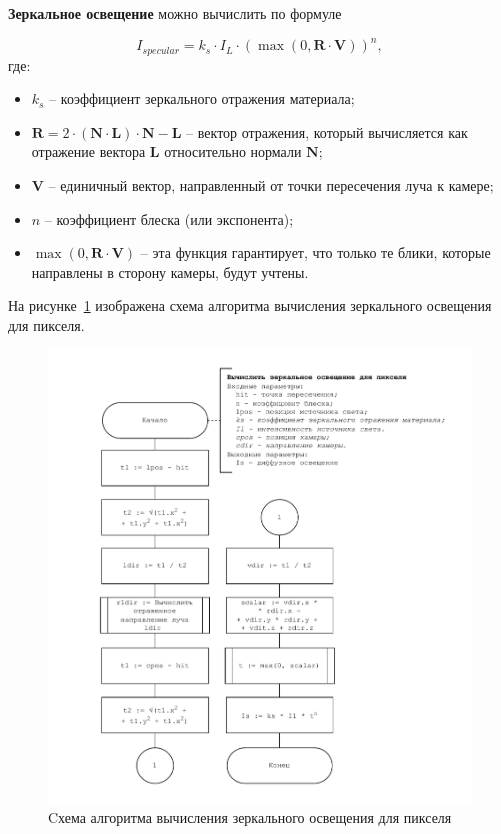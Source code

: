\textbf{Зеркальное освещение} можно вычислить по формуле

\begin{equation}
	I_{specular} = k_s \cdot I_L \cdot \left( \max(0, \mathbf{R} \cdot \mathbf{V}) \right)^n,
\end{equation} где:

\begin{itemize}
	\item \( k_s \) -- коэффициент зеркального отражения материала;
	\item \( \mathbf{R} = 2 \cdot (\mathbf{N} \cdot \mathbf{L}) \cdot \mathbf{N} - \mathbf{L} \) -- вектор отражения, который вычисляется как отражение вектора \( \mathbf{L} \) относительно нормали \( \mathbf{N} \);
	\item \( \mathbf{V} \) -- единичный вектор, направленный от точки пересечения луча к камере;
	\item \( n \) -- коэффициент блеска (или экспонента);
	\item \( \max(0, \mathbf{R} \cdot \mathbf{V}) \) -- эта функция гарантирует, что только те блики, которые направлены в сторону камеры, будут учтены.
\end{itemize}

На рисунке~\ref{fig:phong-spec} изображена схема алгоритма вычисления зеркального освещения для пикселя.

\newpage
\begin{figure}[ht!]
	\begin{center}
		\includegraphics[scale=1.0]{diag/main-phong-specular.pdf}
	\end{center}
	\caption{Cхема алгоритма вычисления зеркального освещения для пикселя}
	\label{fig:phong-spec}
\end{figure}

